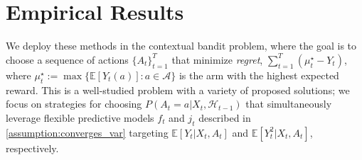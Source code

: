 \documentclass[11pt]{article}
\newcommand{\E}{\mathbb{E}}
\begin{document}
\section{Empirical Results} \label{sec:empirical_results}


We deploy these methods in the contextual bandit problem, where the goal is to choose a sequence of actions $\{A_{t}\}_{t=1}^{T}$ that minimize \emph{regret},
$\sum_{t=1}^{T} \left(\mu^{\star}_{t} - Y_{t}\right)$, where $\mu^{\star}_{t} := \max \{  \E[Y_{t}(a)] : a \in \mathcal{A} \}$ is the arm with the highest expected reward. This is a well-studied problem with a variety of proposed solutions; we focus on strategies for choosing $P(A_{t} = a| X_{t},\mathcal{H}_{t-1})$ that simultaneously leverage flexible predictive models $f_{t}$ and $j_{t}$ described in \cref{assumption:converges_var} targeting $\E[Y_{t}|X_{t},A_{t}]$ and $\E[Y_{t}^{2}|X_{t},A_{t}]$, respectively. 
\end{document}
